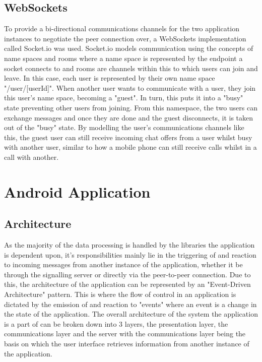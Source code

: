 \documentclass[]{report}
\begin{document}
			\subsection{WebSockets}
			To provide a bi-directional communications channels for the two application instances to negotiate the peer connection over, a WebSockets implementation called Socket.io was used. Socket.io models communication using the concepts of name spaces and rooms where a name space is represented by the endpoint a socket connects to and rooms are channels within this to which users can join and leave. In this case, each user is represented by their own name space "/user/[userId]". When another user wants to communicate with a user, they join this user's name space, becoming a "guest". In turn, this puts it into a "busy" state preventing other users from joining. From this namespace, the two users can exchange messages and once they are done and the guest disconnects, it is taken out of the "busy" state. By modelling the user's communications channels like this, the guest user can still receive incoming chat offers from a user whilst busy with another user, similar to how a mobile phone can still receive calls whilst in a call with another. 
			
		\section{Android Application}
			
			\subsection{Architecture}
			As the majority of the data processing is handled by the libraries the application is dependent upon, it's responsibilities mainly lie in the triggering of and reaction to incoming messages from another instance of the application, whether it be through the signalling server or directly via the peer-to-peer connection. Due to this, the architecture of the application can be represented by an "Event-Driven Architecture" pattern. This is where the flow of control in an application is dictated by the emission of and reaction to "events" where an event is a change in the state of the application. The overall architecture of the system the application is a part of can be broken down into 3 layers, the presentation layer, the communications layer and the server with the communications layer being the basis on which the user interface retrieves information from another instance of the application.
			
\end{document}
